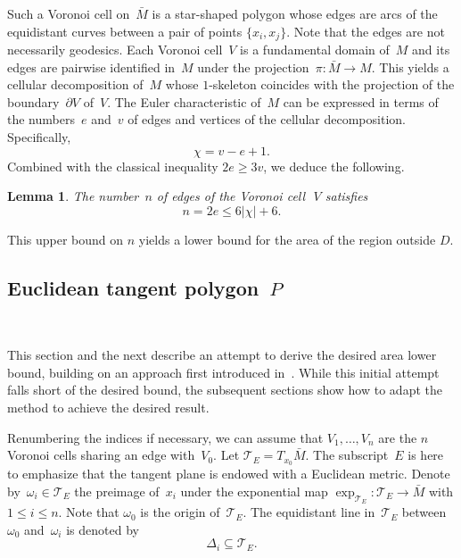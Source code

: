\documentclass[12pt,reqno]{amsart}
\newtheorem{lemma}[theorem]{Lemma}
\theoremstyle{definition}
\numberwithin{equation}{section}
\numberwithin{equation}{section}
\begin{document}
Such a Voronoi cell on~$\bar{M}$ is a star-shaped polygon whose edges are arcs of the equidistant curves between a pair of points $\{x_i,x_j\}$.
Note that the edges are not necessarily geodesics.
Each Voronoi cell~$V$ is a fundamental domain of~$M$ and its edges are pairwise identified in~$M$ under the projection~$\pi:\bar{M} \to M$.
This yields a cellular decomposition of~$M$ whose $1$-skeleton coincides with the projection of the boundary~$\partial V$ of~$V$.
The Euler characteristic of~$M$ can be expressed in terms of the numbers~$e$ and~$v$ of edges and vertices of the cellular decomposition.
Specifically,
\[
\chi= v-e+1.
\]
Combined with the classical inequality $2e \geq 3v$, we deduce the following.

\begin{lemma}
\label{l31}
The number~$n$ of edges of the Voronoi cell\,~$V$ satisfies
\[
n=2e \leq 6 |\chi| +6.
\]
\end{lemma}
This upper bound on $n$ yields a lower bound for the area of the
region outside $D$.

\subsection{Euclidean tangent polygon~$P$} \label{sec:P}

\mbox{ } \medskip

This section and the next describe an attempt to derive the desired area lower bound, building on an approach first introduced in~\cite{KS06}.
While this initial attempt falls short of the desired bound, the subsequent sections show how to adapt the method to achieve the desired result. 

\medskip

Renumbering the indices if necessary, we can assume that
$V_1,\dots,V_n$ are the $n$ Voronoi cells sharing an edge with~$V_0$.
Let $\mathcal{T}_E= T_{x_0} \bar{M}$.  The subscript~$E$ is here to
emphasize that the tangent plane is endowed with a Euclidean metric.
Denote by~$\omega_i \in \mathcal{T}_E$ the preimage of~$x_i$ under the
exponential map $\exp_{\mathcal{T}_E}^{\phantom{I^I_I}}: \mathcal{T}_E
\to \bar{M}$ with $1 \leq i \leq n$.  Note that $\omega_0$ is the
origin of~$\mathcal{T}_E$.  The equidistant line in~$\mathcal{T}_E$
between~$\omega_0$ and~$\omega_i$ is denoted by
\[
\Delta_i \subseteq \mathcal{T}_E.
\]
\end{document}
